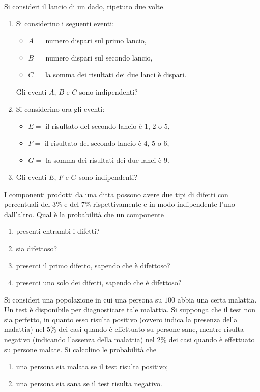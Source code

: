 Si consideri il lancio di un dado, ripetuto due volte.
\begin{enumerate}
	\item Si considerino i seguenti eventi:
	\begin{itemize}
		\item $A=$ numero dispari sul primo lancio,
		\item $B=$ numero dispari sul secondo lancio,
		\item $C=$ la somma dei risultati dei due lanci è dispari.
	\end{itemize}
	Gli eventi $A$, $B$ e $C$ sono indipendenti?
	\item Si considerino ora gli eventi:
	\begin{itemize}
		\item $E=$ il risultato del secondo lancio è $1$, $2$ o $5$,
		\item $F=$ il risultato del secondo lancio è $4$, $5$ o $6$,
		\item $G=$ la somma dei risultati dei due lanci è $9$.
	\end{itemize}
	\item Gli eventi $E$, $F$ e $G$ sono indipendenti?
\end{enumerate}

\Esercizio{}

I componenti prodotti da una ditta possono avere due tipi di difetti con percentuali del $3\%$ e del $7\%$ rispettivamente e in modo indipendente l'uno dall'altro. Qual è la probabilità che un componente
\begin{enumerate}
	\item presenti entrambi i difetti?
	\item sia difettoso?
	\item presenti il primo difetto, sapendo che è difettoso?
	\item presenti uno solo dei difetti, sapendo che è difettoso?
\end{enumerate}

\Esercizio{}

Si consideri una popolazione in cui una persona su $100$ abbia una certa malattia. Un test è disponibile per diagnosticare tale malattia. Si supponga che il test non sia perfetto, in quanto esso risulta positivo (ovvero indica la presenza della malattia) nel $5\%$ dei casi quando è effettuato su persone sane, mentre risulta negativo (indicando l'assenza della malattia) nel $2\%$ dei casi quando è effettuato su persone malate. Si calcolino le probabilità che
\begin{enumerate}
	\item una persona sia malata se il test risulta positivo;
	\item una persona sia sana se il test risulta negativo.
\end{enumerate}

